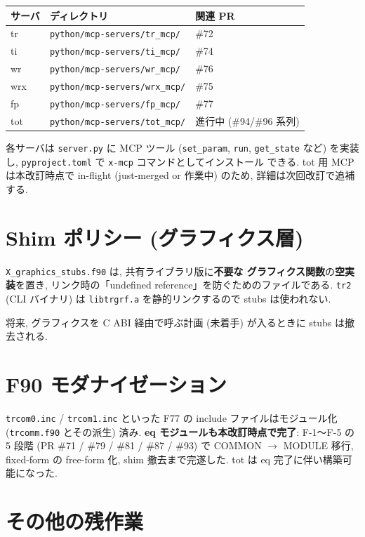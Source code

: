 \documentclass[11pt,a4paper]{report}
\begin{document}
\begin{center}
\small
\begin{tabular}{@{}lll@{}}
\toprule
サーバ & ディレクトリ & 関連 PR \\ \midrule
tr  & \texttt{python/mcp-servers/tr\_mcp/}  & \#72 \\
ti  & \texttt{python/mcp-servers/ti\_mcp/}  & \#74 \\
wr  & \texttt{python/mcp-servers/wr\_mcp/}  & \#76 \\
wrx & \texttt{python/mcp-servers/wrx\_mcp/} & \#75 \\
fp  & \texttt{python/mcp-servers/fp\_mcp/}  & \#77 \\
tot & \texttt{python/mcp-servers/tot\_mcp/} & 進行中 (\#94/\#96 系列) \\
\bottomrule
\end{tabular}
\end{center}

各サーバは \texttt{server.py} に MCP ツール (\texttt{set\_param},
\texttt{run}, \texttt{get\_state} など) を実装し,
\texttt{pyproject.toml} で \texttt{x-mcp} コマンドとしてインストール
できる. tot 用 MCP は本改訂時点で in-flight (just-merged or
作業中) のため, 詳細は次回改訂で追補する.

\section{Shim ポリシー (グラフィクス層)}

\texttt{X\_graphics\_stubs.f90} は, 共有ライブラリ版に\textbf{不要な
グラフィクス関数}の\textbf{空実装}を置き, リンク時の「undefined
reference」を防ぐためのファイルである. \texttt{tr2} (CLI バイナリ)
は \texttt{libtrgrf.a} を静的リンクするので stubs は使われない.

将来, グラフィクスを C ABI 経由で呼ぶ計画 (未着手) が入るときに
stubs は撤去される.

\section{F90 モダナイゼーション}

\texttt{trcom0.inc} / \texttt{trcom1.inc} といった F77 の include
ファイルはモジュール化 (\texttt{trcomm.f90} とその派生) 済み.
\textbf{eq モジュールも本改訂時点で完了}: F-1〜F-5 の 5 段階
(PR \#71 / \#79 / \#81 / \#87 / \#93) で COMMON $\to$ MODULE 移行,
fixed-form の free-form 化, shim 撤去まで完遂した.
tot は eq 完了に伴い構築可能になった.

\section{その他の残作業}
\end{document}
